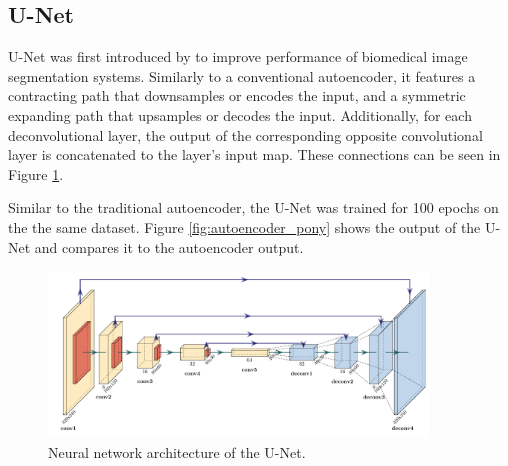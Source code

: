 \documentclass{l4proj}
\begin{document}
\subsection{U-Net}

U-Net was first introduced by \citet{ronneberger_u-net_2015} to improve performance of biomedical image segmentation systems. Similarly to a conventional autoencoder, it features a contracting path that downsamples or encodes the input, and a symmetric expanding path that upsamples or decodes the input. Additionally, for each deconvolutional layer, the output of the corresponding opposite convolutional layer is concatenated to the layer's input map. These connections can be seen in Figure \ref{fig:unet_architecture}. 

Similar to the traditional autoencoder, the U-Net was trained for 100 epochs on the the same dataset. Figure \ref{fig:autoencoder_pony} shows the output of the U-Net and compares it to the autoencoder output.



\begin{figure}[ht]
  \centering
  \includegraphics[width=0.9\textwidth]{images/unet/unet}
  \caption{Neural network architecture of the U-Net.}
  \label{fig:unet_architecture}
\end{figure}
\end{document}
